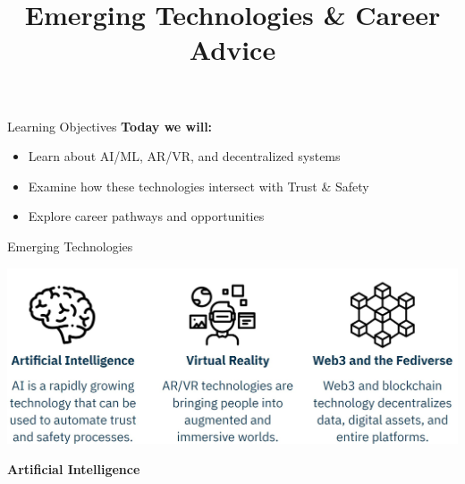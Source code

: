 \documentclass[nobackground,dvipsnames,table]{beamer}
\title[]{Emerging Technologies \& Career Advice}
\author[]{}
\date[2023]{}
\begin{document}


\begin{frame}
    \titlepage
\end{frame}



\begin{frame}{Learning Objectives}
\textbf{Today we will:}

\begin{itemize}
    \item Learn about AI/ML, AR/VR, and decentralized systems
    \item Examine how these technologies intersect with Trust \& Safety
    \item Explore career pathways and opportunities
\end{itemize}

\end{frame}



\begin{frame}{Emerging Technologies}

\begin{center}
    \includegraphics[width=\textwidth]{img/fig1.jpg}
\end{center}

\end{frame}


\begin{frame}{}

\Huge{\textbf{Artificial Intelligence}}

\end{frame}
\end{document}
